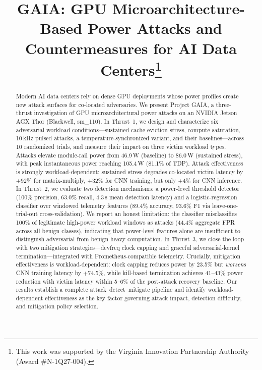 \documentclass[conference]{IEEEtran}
\begin{document}
\title{GAIA: GPU Microarchitecture-Based Power Attacks and Countermeasures for AI Data Centers\thanks{This work was supported by the Virginia Innovation Partnership Authority (Award \#N-1Q27-004).}}

\author{
\and
{}
}

\maketitle

\begin{abstract}
Modern AI data centers rely on dense GPU deployments whose power profiles
create new attack surfaces for co-located adversaries.  We present
Project GAIA, a three-thrust investigation of GPU microarchitectural
power attacks on an NVIDIA Jetson AGX Thor (Blackwell, sm\_110).
In Thrust~1, we design and characterize six adversarial workload
conditions---sustained cache-eviction stress, compute saturation,
10\,kHz pulsed attacks, a temperature-synchronized variant, and their
baselines---across 10 randomized trials, and measure their impact on
three victim workload types.  Attacks elevate module-rail power from
46.9\,W (baseline) to 86.0\,W (sustained stress), with peak
instantaneous power reaching 105.4\,W (81.1\% of TDP).
Attack effectiveness is strongly workload-dependent: sustained stress
degrades co-located victim latency by $+$92\% for matrix-multiply,
$+$32\% for CNN training, but only $+$4\% for CNN inference.
In Thrust~2, we evaluate two detection mechanisms:
a power-level threshold detector (100\% precision, 63.0\% recall,
4.3\,s mean detection latency) and a logistic-regression classifier
over windowed telemetry features (89.4\% accuracy, 93.6\% F1 via
leave-one-trial-out cross-validation).  We report an honest limitation:
the classifier misclassifies 100\% of legitimate high-power workload
windows as attacks (44.4\% aggregate FPR across all benign classes),
indicating that power-level features alone are insufficient to
distinguish adversarial from benign heavy computation.
In Thrust~3, we close the loop with two mitigation strategies---devfreq
clock capping and graceful adversarial-kernel termination---integrated
with Prometheus-compatible telemetry.  Crucially, mitigation
effectiveness is workload-dependent: clock capping reduces power by
23.5\% but \emph{worsens} CNN training latency by $+$74.5\%, while
kill-based termination achieves 41--43\% power reduction with victim
latency within 5--6\% of the post-attack recovery baseline.
Our results establish a complete attack--detect--mitigate pipeline and
identify workload-dependent effectiveness as the key factor governing
attack impact, detection difficulty, and mitigation policy selection.
\end{abstract}
\end{document}
